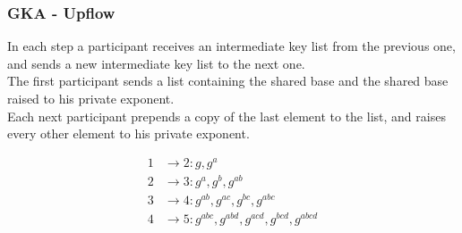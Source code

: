 \begin{frame}
  \frametitle{GKA - Upflow}
  In each step a participant receives an intermediate key list from the previous one, and sends a new intermediate key list to the next one.\\[0.3cm]

  The first participant sends a list containing the shared base and the shared base raised to his private exponent.\\[0.3cm]

  Each next participant prepends a copy of the last element to the list, and raises every other element to his private exponent.\\[0.3cm]

  \begin{minipage}{.47\textwidth}
    \begin{align*}
       1 & \rightarrow 2: g, g^a \\
       2 & \rightarrow 3: g^a, g^b, g^{ab} \\
       3 & \rightarrow 4: g^{ab}, g^{ac}, g^{bc}, g^{abc} \\
       4 & \rightarrow 5: g^{abc}, g^{abd}, g^{acd}, g^{bcd}, g^{abcd}
    \end{align*}
  \end{minipage}
  \begin{minipage}{.47\textwidth}
   \begin{figure}
    \end{figure}
  \end{minipage}
\end{frame}

